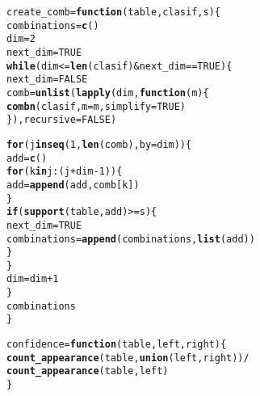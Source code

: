 \documentclass[12pt]{report}\usepackage[]{graphicx}\usepackage[dvipsnames]{xcolor}
\makeatletter
\newcommand{\hlnum}[1]{\textcolor[rgb]{0.686,0.059,0.569}{#1}}%
\newcommand{\hlopt}[1]{\textcolor[rgb]{0,0,0}{#1}}%
\newcommand{\hlstd}[1]{\textcolor[rgb]{0.345,0.345,0.345}{#1}}%
\newcommand{\hlkwa}[1]{\textcolor[rgb]{0.161,0.373,0.58}{\textbf{#1}}}%
\newcommand{\hlkwb}[1]{\textcolor[rgb]{0.69,0.353,0.396}{#1}}%
\newcommand{\hlkwc}[1]{\textcolor[rgb]{0.333,0.667,0.333}{#1}}%
\newcommand{\hlkwd}[1]{\textcolor[rgb]{0.737,0.353,0.396}{\textbf{#1}}}%
\newenvironment{kframe}{%
 \def\at@end@of@kframe{}%
 \ifinner\ifhmode%
  \def\at@end@of@kframe{\end{minipage}}%
  \begin{minipage}{\columnwidth}%
 \fi\fi%
 \def\FrameCommand##1{\hskip\@totalleftmargin \hskip-\fboxsep
 \colorbox{shadecolor}{##1}\hskip-\fboxsep
     \hskip-\linewidth \hskip-\@totalleftmargin \hskip\columnwidth}%
 \MakeFramed {\advance\hsize-\width
   \@totalleftmargin\z@ \linewidth\hsize
   \@setminipage}}%
 {\par\unskip\endMakeFramed%
 \at@end@of@kframe}
\newenvironment{knitrout}{}{} %
\makeatother
\begin{document}
			
			
\begin{knitrout}
\color{fgcolor}\begin{kframe}
\begin{alltt}
\hlstd{create_comb} \hlkwb{=} \hlkwa{function}\hlstd{(}\hlkwc{table}\hlstd{,} \hlkwc{clasif}\hlstd{,} \hlkwc{s}\hlstd{) \{}
        \hlstd{combinations} \hlkwb{=} \hlkwd{c}\hlstd{()}
        \hlstd{dim} \hlkwb{=} \hlnum{2}
        \hlstd{next_dim} \hlkwb{=} \hlnum{TRUE}
        \hlkwa{while} \hlstd{(dim} \hlopt{<=} \hlkwd{len}\hlstd{(clasif)} \hlopt{&} \hlstd{next_dim} \hlopt{==} \hlnum{TRUE}\hlstd{) \{}
                \hlstd{next_dim} \hlkwb{=} \hlnum{FALSE}
                \hlstd{comb} \hlkwb{=} \hlkwd{unlist}\hlstd{(}\hlkwd{lapply}\hlstd{(dim,} \hlkwa{function}\hlstd{(}\hlkwc{m}\hlstd{) \{}
                        \hlkwd{combn}\hlstd{(clasif,} \hlkwc{m}\hlstd{=m,} \hlkwc{simplify}\hlstd{=}\hlnum{TRUE}\hlstd{)}
                        \hlstd{\}),} \hlkwc{recursive}\hlstd{=}\hlnum{FALSE}\hlstd{)}

                \hlkwa{for} \hlstd{(j} \hlkwa{in} \hlkwd{seq}\hlstd{(}\hlnum{1}\hlstd{,} \hlkwd{len}\hlstd{(comb),} \hlkwc{by}\hlstd{=dim)) \{}
                        \hlstd{add} \hlkwb{=} \hlkwd{c}\hlstd{()}
                        \hlkwa{for} \hlstd{(k} \hlkwa{in} \hlstd{j}\hlopt{:}\hlstd{(j}\hlopt{+}\hlstd{dim}\hlopt{-}\hlnum{1}\hlstd{)) \{}
                                \hlstd{add} \hlkwb{=} \hlkwd{append}\hlstd{(add, comb[k])}
                        \hlstd{\}}
                        \hlkwa{if} \hlstd{(}\hlkwd{support}\hlstd{(table, add)} \hlopt{>=} \hlstd{s) \{}
                                \hlstd{next_dim} \hlkwb{=} \hlnum{TRUE}
                                \hlstd{combinations} \hlkwb{=} \hlkwd{append}\hlstd{(combinations,} \hlkwd{list}\hlstd{(add))}
                        \hlstd{\}}
                \hlstd{\}}
                \hlstd{dim} \hlkwb{=} \hlstd{dim}\hlopt{+}\hlnum{1}
        \hlstd{\}}
        \hlstd{combinations}
\hlstd{\}}
\end{alltt}
\end{kframe}
\end{knitrout}
			
			
			
\begin{knitrout}
\color{fgcolor}\begin{kframe}
\begin{alltt}
\hlstd{confidence} \hlkwb{=} \hlkwa{function}\hlstd{(}\hlkwc{table}\hlstd{,} \hlkwc{left}\hlstd{,} \hlkwc{right}\hlstd{) \{}
        \hlkwd{count_appearance}\hlstd{(table,} \hlkwd{union}\hlstd{(left, right))} \hlopt{/}
                \hlkwd{count_appearance}\hlstd{(table, left)}
\hlstd{\}}
\end{alltt}
\end{kframe}
\end{knitrout}
			
\end{document}
